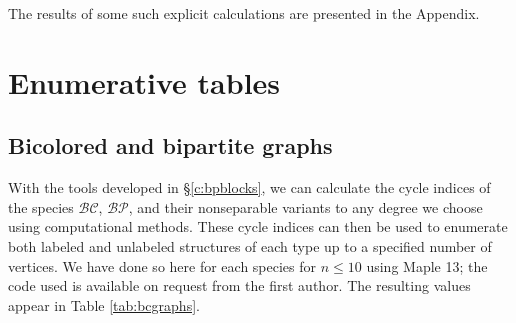 \documentclass[sectionflow,singlespace,twoside]{brandiss} %
\numberwithin{section}{chapter}
\numberwithin{figure}{chapter}
\begin{document}
The results of some such explicit calculations are presented in the Appendix.

\appendix
\chapter{Enumerative tables}\label{c:enum}
\section{Bicolored and bipartite graphs}\label{s:bpenum}
With the tools developed in \S \ref{c:bpblocks}, we can calculate the cycle indices of the species $\mathcal{BC}$, $\mathcal{BP}$, and their nonseparable variants to any degree we choose using computational methods.
These cycle indices can then be used to enumerate both labeled and unlabeled structures of each type up to a specified number of vertices.
We have done so here for each species for $n \leq 10$ using Maple 13; the code used is available on request from the first author.
The resulting values appear in Table \ref{tab:bcgraphs}.
\end{document}
